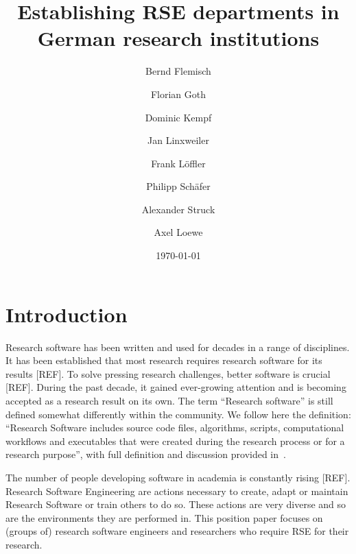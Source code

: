 \documentclass{article}
\title{Establishing RSE departments in German research institutions}
\author{
    Bernd Flemisch
    \and
    Florian Goth
    \and
    Dominic Kempf
    \and
    Jan Linxweiler
    \and
    Frank Löffler
    \and
    Philipp Schäfer
    \and
    Alexander Struck
    \and
    Axel Loewe
}
\date{\today}
\begin{document}
\maketitle

\section{Introduction}
Research software has been written and used for decades in a range of disciplines.
It has been established that most research requires research software for its results [REF].
To solve pressing research challenges, better software is crucial [REF].
During the past decade, it gained ever-growing attention and is becoming accepted as a research result on its own.
The term “Research software” is still defined somewhat differently within the community.
We follow here the definition: “Research Software includes source code files, algorithms, scripts, computational workflows and executables that were created during the research process or for a research purpose”, with full definition and discussion provided in~\autocite{Gruenpeter2021}.

The number of people developing software in academia is constantly rising [REF].
Research Software Engineering are actions necessary to create, adapt or maintain Research Software or train others to do so.
These actions are very diverse and so are the environments they are performed in.
This position paper focuses on (groups of) research software engineers and researchers who require RSE for their research.
\end{document}
